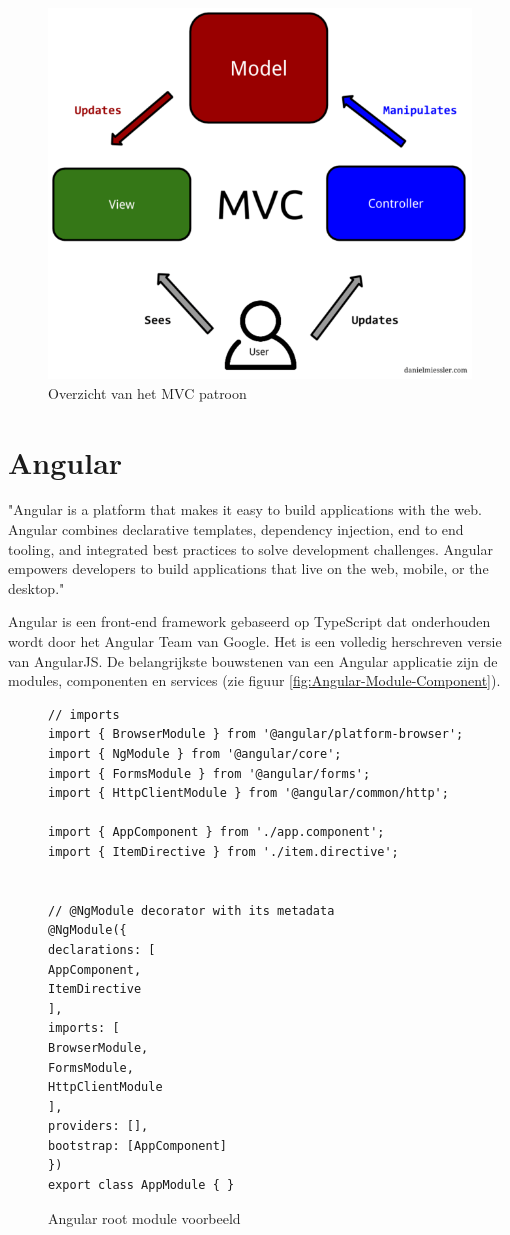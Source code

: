 \begin{figure}[H]
	\centering
	\includegraphics[width=0.6\linewidth]{MVC}
	\caption{Overzicht van het MVC patroon \autocite{DanielMissler2017}}
	\label{fig:Mvc}
\end{figure}

\section{Angular}
"Angular is a platform that makes it easy to build applications with the web. Angular combines declarative templates, dependency injection, end to end tooling, and integrated best practices to solve development challenges. Angular empowers developers to build applications that live on the web, mobile, or the desktop." \autocite{Angular2019} 

Angular is een front-end framework gebaseerd op TypeScript dat onderhouden wordt door het Angular Team van Google. Het is een volledig herschreven versie van AngularJS.
De belangrijkste bouwstenen van een Angular applicatie zijn de modules, componenten en services (zie figuur \ref{fig:Angular-Module-Component}).


\begin{figure}
\begin{lstlisting}[]
// imports
import { BrowserModule } from '@angular/platform-browser';
import { NgModule } from '@angular/core';
import { FormsModule } from '@angular/forms';
import { HttpClientModule } from '@angular/common/http';

import { AppComponent } from './app.component';
import { ItemDirective } from './item.directive';


// @NgModule decorator with its metadata
@NgModule({
declarations: [
AppComponent,
ItemDirective
],
imports: [
BrowserModule,
FormsModule,
HttpClientModule
],
providers: [],
bootstrap: [AppComponent]
})
export class AppModule { }
\end{lstlisting}
\caption{Angular root module voorbeeld}
\end{figure}


